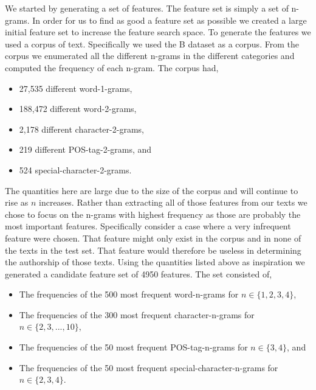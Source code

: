 We started by generating a set of features. The feature set is simply a set of
n-grams. In order for us to find as good a feature set as possible we created a
large initial feature set to increase the feature search space. To generate the
features we used a corpus of text. Specifically we used the \gls{B} dataset as a
corpus. From the corpus we enumerated all the different n-grams in the different
categories and computed the frequency of each n-gram. The corpus had,

\begin{itemize}
    \item 27,535 different word-1-grams,
    \item 188,472 different word-2-grams,
    \item 2,178 different character-2-grams,
    \item 219 different \gls{POS}-tag-2-grams, and
    \item 524 special-character-2-grams.
\end{itemize}

The quantities here are large due to the size of the corpus and will continue
to rise as $n$ increases. Rather than extracting all of those features from
our texts we chose to focus on the n-grams with highest frequency as those are
probably the most important features. Specifically consider a case where a very
infrequent feature were chosen. That feature might only exist in the corpus and
in none of the texts in the test set. That feature would therefore be useless
in determining the authorship of those texts. Using the quantities listed above
as inspiration we generated a candidate feature set of 4950 features. The set
consisted of,

\begin{itemize}

    \item

        The frequencies of the 500 most frequent word-n-grams for $n \in \{1, 2,
        3, 4\}$,

    \item

        The frequencies of the 300 most frequent character-n-grams for $n \in
        \{2, 3, ..., 10\}$,

    \item

        The frequencies of the 50 most frequent \gls{POS}-tag-n-grams for $n \in
        \{3, 4\}$, and

    \item

        The frequencies of the 50 most frequent special-character-n-grams for $n
        \in \{2, 3, 4\}$.

\end{itemize}

